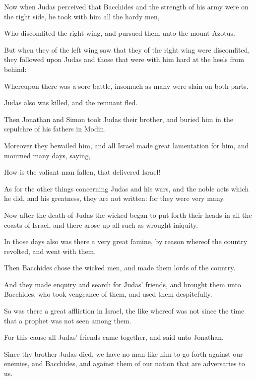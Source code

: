 {\par }{\PP {}Now when Judas perceived that Bacchides and the strength of his army were on the right side, he took with him all the hardy men,
\par }{\PP {}Who discomfited the right wing, and pursued them unto the mount Azotus.
\par }{\PP {}But when they of the left wing saw that they of the right wing were discomfited, they followed upon Judas and those that were with him hard at the heels from behind:
\par }{\PP {}Whereupon there was a sore battle, insomuch as many were slain on both parts.
\par }{\PP {}Judas also was killed, and the remnant fled.
\par }{\PP {}Then Jonathan and Simon took Judas their brother, and buried him in the sepulchre of his fathers in Modin.
\par }{\PP {}Moreover they bewailed him, and all Israel made great lamentation for him, and mourned many days, saying,
\par }{\PP {}How is the valiant man fallen, that delivered Israel!
\par }{\PP {}As for the other things concerning Judas and his wars, and the noble acts which he did, and his greatness, they are not written: for they were very many.
\par }{\PP {}Now after the death of Judas the wicked began to put forth their heads in all the coasts of Israel, and there arose up all such as wrought iniquity.
\par }{\PP {}In those days also was there a very great famine, by reason whereof the country revolted, and went with them.
\par }{\PP {}Then Bacchides chose the wicked men, and made them lords of the country.
\par }{\PP {}And they made enquiry and search for Judas’ friends, and brought them unto Bacchides, who took vengeance of them, and used them despitefully.
\par }{\PP {}So was there a great affliction in Israel, the like whereof was not since the time that a prophet was not seen among them.
\par }{\PP {}For this cause all Judas’ friends came together, and said unto Jonathan,
\par }{\PP {}Since thy brother Judas died, we have no man like him to go forth against our enemies, and Bacchides, and against them of our nation that are adversaries to us.
}
